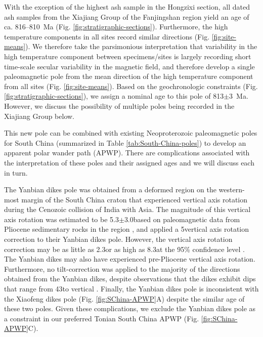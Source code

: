 With the exception of the highest ash sample in the Hongzixi section, all dated ash samples from the Xiajiang Group of the Fanjingshan region yield an age of ca. 816--810~Ma (Fig. \ref{fig:stratigraphic-sections}). Furthermore, the high temperature components in all sites record similar directions (Fig. \ref{fig:site-means}). We therefore take the parsimonious interpretation that variability in the high temperature component between specimens/sites is largely recording short time-scale secular variability in the magnetic field, and therefore develop a single paleomagnetic pole from the mean direction of the high temperature component from all sites (Fig. \ref{fig:site-means}). Based on the geochronologic constraints (Fig. \ref{fig:stratigraphic-sections}), we assign a nominal age to this pole of 813$\pm$3~Ma. However, we discuss the possibility of multiple poles being recorded in the Xiajiang Group below.

This new pole can be combined with existing Neoproterozoic paleomagnetic poles for South China (summarized in Table \ref{tab:South-China-poles}) to develop an apparent polar wander path (APWP). There are complications associated with the interpretation of these poles and their assigned ages and we will discuss each in turn.

The Yanbian dikes pole \citep{Niu2016a} was obtained from a deformed region on the western-most margin of the South China craton that experienced vertical axis rotation during the Cenozoic collision of India with Asia. The magnitude of this vertical axis rotation was estimated to be 5.3$\pm$3.0\degrees based on paleomagnetic data from Pliocene sedimentary rocks in the region \citep{Zhu2008a}, and \citet{Niu2016a} applied a 5\degrees vertical axis rotation correction to their Yanbian dikes pole. However, the vertical axis rotation correction may be as little as 2.3\degrees or as high as 8.3\degrees at the 95\% confidence level \citep{Zhu2008a}. The Yanbian dikes may also have experienced pre-Pliocene vertical axis rotation. Furthermore, no tilt-correction was applied to the majority of the directions obtained from the Yanbian dikes, despite observations that the dikes exhibit dips that range from 43\degrees to vertical \citep{Niu2016a}. Finally, the Yanbian dikes pole is inconsistent with the Xiaofeng dikes pole (Fig. \ref{fig:SChina-APWP}A) despite the similar age of these two poles. Given these complications, we exclude the Yanbian dikes pole as a constraint in our preferred Tonian South China APWP (Fig. \ref{fig:SChina-APWP}C).

